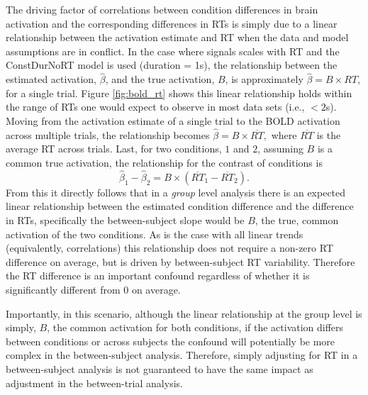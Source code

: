 \documentclass[titlepage,12pt] {article}
\begin{document}
The driving factor of correlations between condition differences in brain activation and the corresponding differences in RTs is simply due to a linear relationship between the activation estimate and RT when the data and model assumptions are in conflict. In the case where signals scales with RT and the ConstDurNoRT model is used (duration = 1s), the relationship between the estimated activation, $\hat\beta$, and the true activation, $B$, is approximately $\hat\beta = B \times RT$, for a single trial.  Figure \ref{fig:bold_rt} shows this linear relationship holds within the range of RTs one would expect to observe in most data sets (i.e., $<2$s).  Moving from the activation estimate of a single trial to the BOLD activation across multiple trials, the relationship becomes $\hat\beta = B\times \overline{RT}, $ where $\overline{RT}$ is the average RT across trials.  Last, for two conditions, $1$ and $2$, assuming $B$ is a common true activation, the relationship for the contrast of conditions is $$\hat\beta_1 -\hat\beta_2 = B\times\left(\overline{RT}_1 - \overline{RT}_2\right).$$
From this it directly follows that in a \emph{group} level analysis there is an expected linear relationship between the estimated condition difference and the difference in RTs, specifically the between-subject slope would be $B$, the true, common activation of the two conditions.  As is the case with all linear trends (equivalently, correlations) this relationship does not require a non-zero RT difference on average, but is driven by between-subject RT variability. Therefore the RT difference is an important confound regardless of whether it is significantly different from 0 on average.  

Importantly, in this scenario, although the linear relationship at the group level is simply, $B$, the common activation for both conditions, if the activation differs between conditions or across subjects the confound will potentially be more complex in the between-subject analysis.  Therefore, simply adjusting for RT in a between-subject analysis is not guaranteed to have the same impact as adjustment in the between-trial analysis.
\end{document}
